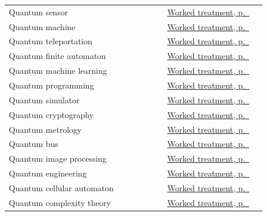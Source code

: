 \documentclass[11pt,oneside]{book}
\begin{document}
\begin{longtable}{p{0.57\linewidth}p{0.35\linewidth}}
\label{index:quantum-sensor}Quantum sensor & \hyperref[topic:quantum-sensor]{Worked treatment, p.~\pageref*{topic:quantum-sensor}} \\
\label{index:quantum-machine}Quantum machine & \hyperref[topic:quantum-machine]{Worked treatment, p.~\pageref*{topic:quantum-machine}} \\
\label{index:quantum-teleportation}Quantum teleportation & \hyperref[topic:quantum-teleportation]{Worked treatment, p.~\pageref*{topic:quantum-teleportation}} \\
\label{index:quantum-finite-automaton}Quantum finite automaton & \hyperref[topic:quantum-finite-automaton]{Worked treatment, p.~\pageref*{topic:quantum-finite-automaton}} \\
\label{index:quantum-machine-learning}Quantum machine learning & \hyperref[topic:quantum-machine-learning]{Worked treatment, p.~\pageref*{topic:quantum-machine-learning}} \\
\label{index:quantum-programming}Quantum programming & \hyperref[topic:quantum-programming]{Worked treatment, p.~\pageref*{topic:quantum-programming}} \\
\label{index:quantum-simulator}Quantum simulator & \hyperref[topic:quantum-simulator]{Worked treatment, p.~\pageref*{topic:quantum-simulator}} \\
\label{index:quantum-cryptography}Quantum cryptography & \hyperref[topic:quantum-cryptography]{Worked treatment, p.~\pageref*{topic:quantum-cryptography}} \\
\label{index:quantum-metrology}Quantum metrology & \hyperref[topic:quantum-metrology]{Worked treatment, p.~\pageref*{topic:quantum-metrology}} \\
\label{index:quantum-bus}Quantum bus & \hyperref[topic:quantum-bus]{Worked treatment, p.~\pageref*{topic:quantum-bus}} \\
\label{index:quantum-image-processing}Quantum image processing & \hyperref[topic:quantum-image-processing]{Worked treatment, p.~\pageref*{topic:quantum-image-processing}} \\
\label{index:quantum-engineering}Quantum engineering & \hyperref[topic:quantum-engineering]{Worked treatment, p.~\pageref*{topic:quantum-engineering}} \\
\label{index:quantum-cellular-automaton}Quantum cellular automaton & \hyperref[topic:quantum-cellular-automaton]{Worked treatment, p.~\pageref*{topic:quantum-cellular-automaton}} \\
\label{index:quantum-complexity-theory}Quantum complexity theory & \hyperref[topic:quantum-complexity-theory]{Worked treatment, p.~\pageref*{topic:quantum-complexity-theory}} \\
\bottomrule
\end{longtable}
\end{document}

